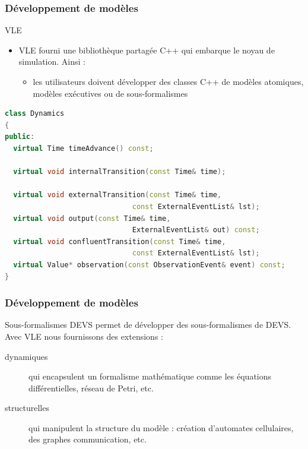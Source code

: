 \documentclass[xetex, compress, table, svgnames]{beamer}
\begin{document}
\begin{frame}[fragile]
  \frametitle{Développement de modèles}
  \begin{block}{VLE}
    \begin{itemize}
    \item VLE fourni une bibliothèque partagée C++ qui embarque le
      noyau de simulation. Ainsi :
      \begin{itemize}
      \item les utilisateurs doivent développer des classes C++ de
        modèles atomiques, modèles exécutives ou de sous-formalismes
      \end{itemize}
    \end{itemize}
  \end{block}
  \begin{exampleblock}{}
\begin{lstlisting}[language=c++]
class Dynamics
{
public:
  virtual Time timeAdvance() const;

  virtual void internalTransition(const Time& time);

  virtual void externalTransition(const Time& time,
                              const ExternalEventList& lst);
  virtual void output(const Time& time,
                              ExternalEventList& out) const;
  virtual void confluentTransition(const Time& time,
                              const ExternalEventList& lst);
  virtual Value* observation(const ObservationEvent& event) const;
}
\end{lstlisting}
  \end{exampleblock}
\end{frame}

\begin{frame}
  \frametitle{Développement de modèles}
  \begin{block}{Sous-formalismes}
    DEVS permet de développer des sous-formalismes de DEVS\@. Avec VLE
    nous fournissons des extensions :
    \begin{description}
    \item[dynamiques] qui encapsulent un formalisme mathématique comme
      les équations différentielles, réseau de Petri, etc.
    \item[structurelles] qui manipulent la structure du modèle :
      création d'automates cellulaires, des graphes communication, etc.
    \end{description}
  \end{block}
\end{frame}
\end{document}
